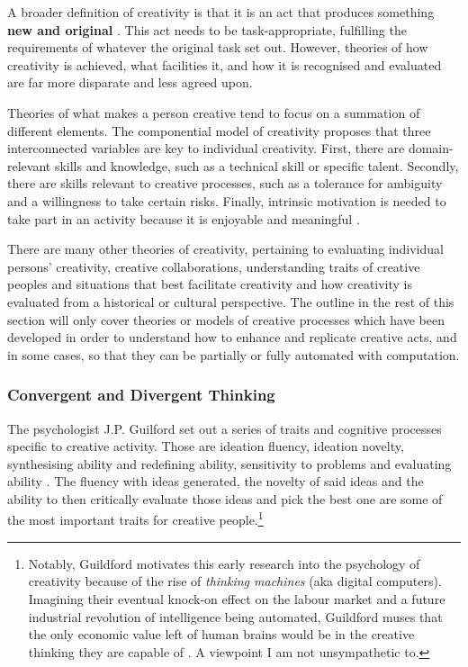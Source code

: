 A broader definition of creativity is that it is an act that produces something \textbf{new and original} \citep{kaufman2021overview}. This act needs to be task-appropriate, fulfilling the requirements of whatever the original task set out. 
However, theories of how creativity is achieved, what facilities it, and how it is recognised and evaluated are far more disparate and less agreed upon. 

Theories of what makes a person creative tend to focus on a summation of different elements.
The componential model of creativity proposes that three interconnected variables are key to individual creativity.
First, there are domain-relevant skills and knowledge, such as a technical skill or specific talent.
Secondly, there are skills relevant to creative processes, such as a tolerance for ambiguity and a willingness to take certain risks.
Finally, intrinsic motivation is needed to take part in an activity because it is enjoyable and meaningful \citep{amabile1983social}.

There are many other theories of creativity, pertaining to evaluating individual persons' creativity, creative collaborations, understanding traits of creative peoples and situations that best facilitate creativity and how creativity is evaluated from a historical or cultural perspective. 
The outline in the rest of this section will only cover theories or models of creative processes which have been developed in order to understand how to enhance and replicate creative acts, and in some cases, so that they can be partially or fully automated with computation.

\subsubsection{Convergent and Divergent Thinking}
\label{c2:subsubsec:convergent-divergent}

The psychologist J.P. Guilford set out a series of traits and cognitive processes specific to creative activity. Those are ideation fluency, ideation novelty, synthesising ability and redefining ability, sensitivity to problems and evaluating ability \citep{guilford1950creativity}. 
The fluency with ideas generated, the novelty of said ideas and the ability to then critically evaluate those ideas and pick the best one are some of the most important traits for creative people.\footnote{Notably, Guildford motivates this early research into the psychology of creativity because of the rise of \textit{thinking machines} (aka digital computers). Imagining their eventual knock-on effect on the labour market and a future industrial revolution of intelligence being automated, Guildford muses that the only economic value left of human brains would be in the creative thinking they are capable of \citep{guilford1950creativity}. A viewpoint I am not unsympathetic to.}

